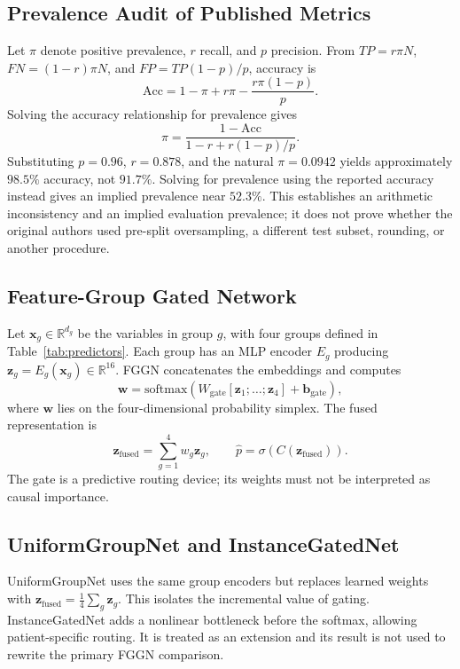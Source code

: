 \documentclass[conference,10pt]{IEEEtran}
\begin{document}
\subsection{Prevalence Audit of Published Metrics}
Let $\pi$ denote positive prevalence, $r$ recall, and $p$ precision. From $TP=r\pi N$, $FN=(1-r)\pi N$, and $FP=TP(1-p)/p$, accuracy is
\begin{equation}
\mathrm{Acc}=1-\pi+r\pi-\frac{r\pi(1-p)}{p}.
\end{equation}
Solving the accuracy relationship for prevalence gives
\begin{equation}
\pi=\frac{1-\mathrm{Acc}}{1-r+r(1-p)/p}.
\end{equation}
Substituting $p=0.96$, $r=0.878$, and the natural $\pi=0.0942$ yields approximately $98.5\%$ accuracy, not $91.7\%$. Solving for prevalence using the reported accuracy instead gives an implied prevalence near $52.3\%$. This establishes an arithmetic inconsistency and an implied evaluation prevalence; it does not prove whether the original authors used pre-split oversampling, a different test subset, rounding, or another procedure.

\subsection{Feature-Group Gated Network}
Let $\mathbf{x}_g\in\mathbb{R}^{d_g}$ be the variables in group $g$, with four groups defined in Table~\ref{tab:predictors}. Each group has an MLP encoder $E_g$ producing $\mathbf{z}_g=E_g(\mathbf{x}_g)\in\mathbb{R}^{16}$. FGGN concatenates the embeddings and computes
\begin{equation}
\mathbf{w}=\mathrm{softmax}(W_{\mathrm{gate}}[\mathbf{z}_1;\ldots;\mathbf{z}_4]+\mathbf{b}_{\mathrm{gate}}),
\end{equation}
where $\mathbf{w}$ lies on the four-dimensional probability simplex. The fused representation is
\begin{equation}
\mathbf{z}_{\mathrm{fused}}=\sum_{g=1}^{4}w_g\mathbf{z}_g,
\qquad \hat{p}=\sigma(C(\mathbf{z}_{\mathrm{fused}})).
\end{equation}
The gate is a predictive routing device; its weights must not be interpreted as causal importance.

\subsection{UniformGroupNet and InstanceGatedNet}
UniformGroupNet uses the same group encoders but replaces learned weights with $\mathbf{z}_{\mathrm{fused}}=\frac{1}{4}\sum_g\mathbf{z}_g$. This isolates the incremental value of gating. InstanceGatedNet adds a nonlinear bottleneck before the softmax, allowing patient-specific routing. It is treated as an extension and its result is not used to rewrite the primary FGGN comparison.
\end{document}
